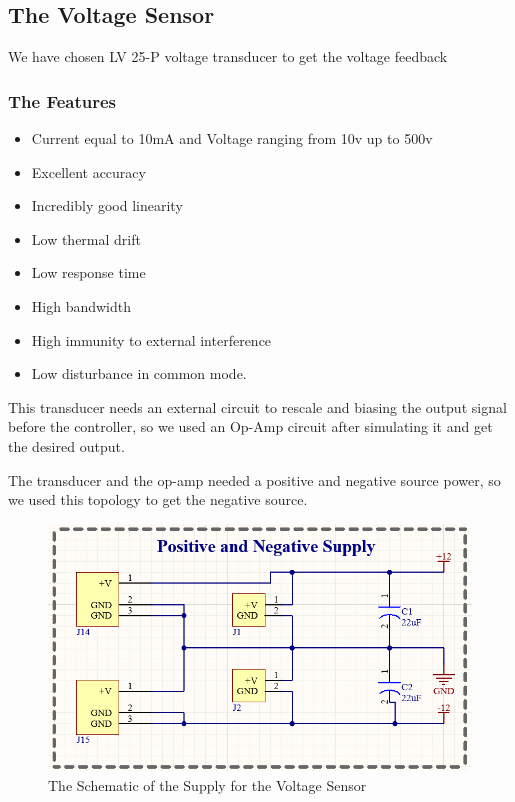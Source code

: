 \documentclass[12pt,a4paper]{book}
\begin{document}
\subsection{The Voltage Sensor}
We have chosen LV 25-P voltage transducer to get the voltage feedback

\subsubsection{The Features}
\begin{itemize}
  \item Current equal to 10mA and Voltage ranging from 10v up to 500v
  \item Excellent accuracy
  \item	Incredibly good linearity
  \item	Low thermal drift
  \item	Low response time
  \item	High bandwidth
  \item	High immunity to external interference
  \item	Low disturbance in common mode.
\end{itemize}
This transducer needs an external circuit to rescale and biasing the output signal before the controller, so we used an Op-Amp circuit after simulating it and get the desired output.

The transducer and the op-amp needed a positive and negative source power, so we used this topology to get the negative source.
\begin{figure}[h!]
  \centering
  \includegraphics[width = 12cm]{image38.png}
  \caption{The Schematic of the Supply for the Voltage Sensor}
  \label{fig:image38}
\end{figure}
\end{document}
